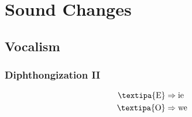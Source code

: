 \documentclass{report}[12pt]
\begin{document}
\section{Sound Changes}

\subsection{Vocalism}

\subsubsection{Diphthongization II}\label{sec:diphthongization_2}

\begin{tcolorbox}
  \begin{align*}  
    \text{\textipa{E}} & \Rightarrow \text{ie} \\
    \text{\textipa{O}} & \Rightarrow \text{we} \\
  \end{align*}
\end{tcolorbox}
\end{document}
